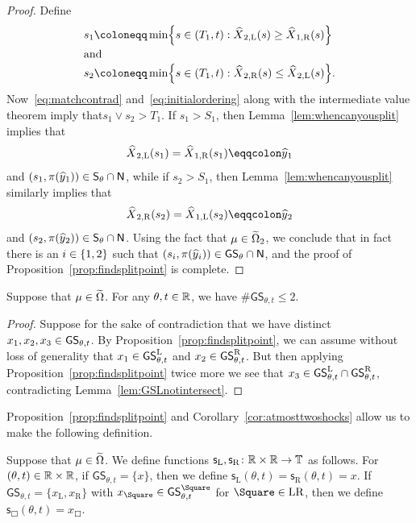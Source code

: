\documentclass[AHL,Unicode,longabstracts]{cedram}
\newcommand*\ssS{\mathsf{S}}
\newcommand*\GS{\mathsf{GS}}
\newcommand*\ssN{\mathsf{N}}
\newcommand*\sfs{\mathsf{s}}
\newcommand*\TT{\mathbb{T}}
\newcommand*\RR{\mathbb{R}}
\newcommand*\st{\mathrel{:}}
\newcommand*\Left{\mathrm{L}}
\newcommand*\Right{\mathrm{R}}
\newcommand*\LR{\mathrm{LR}}
\renewcommand*{\to}{\mathchoice{\longrightarrow}{\rightarrow}{\rightarrow}{\rightarrow}}
\let\oldin\in
\renewcommand{\in}{\mathchoice{\oldin}{\oldin}{\,\oldin\,}{\,\oldin\,}}
\let\oldcap\cap
\renewcommand{\cap}{\mathchoice{\oldcap}{\oldcap}{\,\oldcap\,}{\,\oldcap\,}}
\let\originalleft\left
\let\originalright\right
\renewcommand{\left}{\mathopen{}\mathclose\bgroup\originalleft}
\renewcommand{\right}{\aftergroup\egroup\originalright}
\let\oldhat\hat
\renewcommand*{\hat}[1]{\mathchoice{\widehat{#1}}{\widehat{#1}}{\oldhat{#1}}{\oldhat{#1}}}
\newcommand*\TT{\mathbb{T}}
\newcommand*\RR{\mathbb{R}}
\begin{document}
\begin{proof}
Define
\begin{align*}
s_{1}&\coloneqq\min\left\{s\in(T_{1},t)\st\hat{X}_{2,\Left}(s)\ge\hat{X}_{1,\Right}(s)\right\}
\\[-0.2em]
\intertext{and}
s_{2}&\coloneqq\min\left\{s\in(T_{1},t)\st\hat{X}_{2,\Right}(s)\le\hat{X}_{2,\Left}(s)\right\}.
\end{align*}
Now~\eqref{eq:matchcontrad} and~\eqref{eq:initialordering} along with the intermediate value theorem imply that\linebreak $s_{1}\vee s_{2}>T_{1}$. If $s_{1}>S_{1}$, then Lemma~\ref{lem:whencanyousplit} implies that
\[
\hat{X}_{2,\Left}(s_{1})=\hat{X}_{1,\Right}(s_{1})\eqqcolon\hat{y}_{1}
\]
and $(s_{1},\pi(\hat{y}_{1}))\in\ssS_{\theta}\cap\ssN$, while if $s_{2}>S_{1}$, then Lemma~\ref{lem:whencanyousplit} similarly implies that
\[
\hat{X}_{2,\Right}(s_{2})=\hat{X}_{1,\Left}(s_{2})\eqqcolon\hat{y}_{2}
\]
and $(s_{2},\pi(\hat{y}_{2}))\in\ssS_{\theta}\cap\ssN$. Using the fact that $\mu\in\widetilde{\Omega}_{2}$, we conclude that in fact there is an $i\in\{1,2\}$ such that $(s_{i},\pi(\hat{y}_{i}))\in\GS_{\theta}\cap\ssN$, and the proof of Proposition~\ref{prop:findsplitpoint} is complete.
\end{proof}

\begin{coro}\label{cor:atmosttwoshocks}
Suppose that $\mu\in\widetilde{\Omega}$. For any $\theta,t\in\RR$, we have $\#\GS_{\theta,t}\le2$.
\end{coro}

\begin{proof}
Suppose for the sake of contradiction that we have distinct $x_{1},x_{2},x_{3}\in\GS_{\theta,t}$. By Proposition~\ref{prop:findsplitpoint}, we can assume without loss of generality that $x_{1}\in\GS_{\theta,t}^{\Left}$ and $x_{2}\in\GS_{\theta,t}^{\Right}$. But then applying Proposition~\ref{prop:findsplitpoint} twice more we see that $x_{3}\in\GS_{\theta,t}^{\Left}\cap\GS_{\theta,t}^{\Right}$, contradicting
Lemma~\ref{lem:GSLnotintersect}.
\end{proof}

Proposition~\ref{prop:findsplitpoint} and Corollary~\ref{cor:atmosttwoshocks} allow us to make the following definition.

\begin{defi}\label{def:sLsRdefs}
Suppose that $\mu\in\widetilde{\Omega}$. We define functions $\sfs_{\Left},\sfs_{\Right}\colon\RR\times\RR\to\TT$ as follows. For $(\theta,t)\in\RR\times\RR$, if $\GS_{\theta,t}=\{x\}$, then we define $\sfs_{\Left}(\theta,t)=\sfs_{\Right}(\theta,t)=x$. If $\GS_{\theta,t}=\{x_{\Left},x_{\Right}\}$ with $x_{\Square}\in\GS_{\theta,t}^{\Square}$ for $\Square\in\LR$, then we define $\sfs_{\Square}(\theta,t)=x_{\Square}$.
\end{defi}
\end{document}
